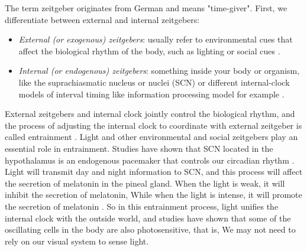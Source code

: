 \documentclass[sigconf]{acmart}
\begin{document}
The term zeitgeber originates from German and means "time-giver". First, we differentiate between external and internal zeitgebers:

\begin{itemize}
\item \emph{External (or exogenous) zeitgebers}: usually refer to environmental cues that affect the biological rhythm of the body, such as lighting \cite{aschoff1965circadian} or social cues \cite{ehlers1988social}.
\item \emph{Internal (or endogenous) zeitgebers}: something inside your body or organism, like the suprachiasmatic nucleus or nuclei (SCN) \cite{buijs2003circadian} or different internal-clock models of interval timing like information processing model for example \cite{gibbon1984scalar}.
\end{itemize}


External zeitgebers and internal clock jointly control the biological rhythm, and the process of adjusting the internal clock to coordinate with external zeitgeber is called entrainment \cite{duffy2005entrainment}. Light and other environmental and social zeitgebers play an essential role in entrainment. Studies have shown that SCN located in the hypothalamus is an endogenous pacemaker that controls our circadian rhythm \cite{albrecht2003mammalian}. Light will transmit day and night information to SCN, and this process will affect the secretion of melatonin in the pineal gland. When the light is weak, it will inhibit the secretion of melatonin, While when the light is intense, it will promote the secretion of melatonin \cite{duffy2005entrainment}. So in this entrainment process, light unifies the internal clock with the outside world, and studies have shown that some of the oscillating cells in the body are also photosensitive, that is, We may not need to rely on our visual system to sense light.
\end{document}
